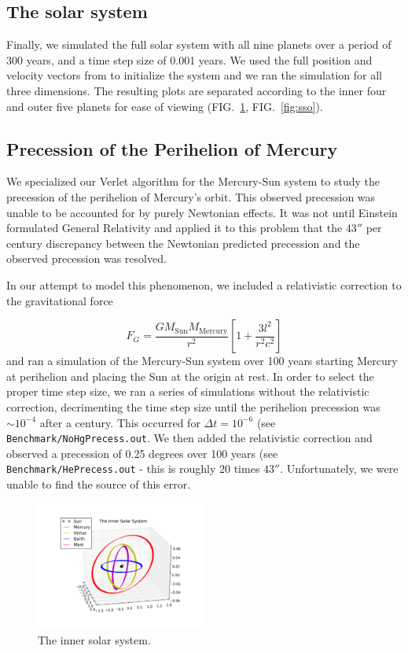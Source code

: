 \documentclass[10pt,showpacs,preprintnumbers,footinbib,amsmath,amssymb,aps,prl,twocolumn,groupedaddress,superscriptaddress,showkeys]{revtex4-1}
\newcommand{\pwrten}[1]{%
	\ensuremath{10^{#1}} }
\begin{document}
\subsection*{The solar system}

Finally, we simulated the full solar system with all nine planets over a period of 300
years, and a time step size of 0.001 years. We used the full position and velocity
vectors from \citep{nasa} to initialize the system and we ran the simulation for all
three dimensions. The resulting plots are separated according to the inner four and
outer five planets for ease of viewing (FIG.~\ref{fig:ssi}, FIG.~\ref{fig:sso}).

\subsection*{Precession of the Perihelion of Mercury}

We specialized our Verlet algorithm for the Mercury-Sun system to study the
precession of the perihelion of Mercury's orbit. This observed precession was
unable to be accounted for by purely Newtonian effects. It was not until Einstein
formulated General Relativity and applied it to this problem that the $43''$ per
century discrepancy between the Newtonian predicted precession and the
observed precession was resolved.

In our attempt to model this phenomenon, we included a relativistic correction
to the gravitational force

\begin{equation*}
F_G = \frac{GM_\mathrm{Sun}M_\mathrm{Mercury}}{r^2}\left[1 + \frac{3l^2}{r^2c^2}\right]
\end{equation*}
and ran a simulation of the Mercury-Sun system over 100 years starting Mercury at perihelion
and placing the Sun at the origin at rest. In order to select the proper time
step size, we ran a series of simulations without the relativistic correction, decrimenting
the time step size until the perihelion precession was $\sim \pwrten{-4}$ after a century.
This occurred for $\Delta t = \pwrten{-6}$ (see \texttt{Benchmark/NoHgPrecess.out}.
We then added the relativistic correction and observed a precession of 0.25 degrees over
100 years (see \texttt{Benchmark/HePrecess.out} - this is roughly 20 times $43''$.
Unfortunately, we were unable to find the source of this error.



\begin{figure}
\centering
	\includegraphics[width=0.5\textwidth]{figures/SSinner.pdf}
	\caption{The inner solar system.}
	\label{fig:ssi}
\end{figure}
\end{document}

